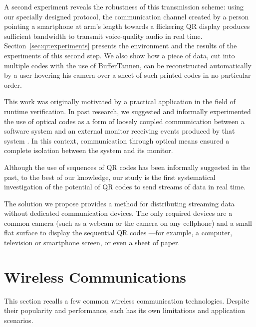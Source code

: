 A second experiment reveals the robustness of this transmission scheme: using our specially designed protocol, the communication channel created by a person pointing a smartphone at arm's length towards a flickering QR display produces sufficient bandwidth to transmit voice-quality audio in real time. Section~\ref{sec:qr:experiments} presents the environment and the results of the experiments of this second step. We also show how a piece of data, cut into multiple codes with the use of BufferTannen, can be reconstructed automatically by a user hovering his camera over a sheet of such printed codes in no particular order.

This work was originally motivated by a practical application in the field of runtime verification. In past research, we suggested and informally experimented the use of optical codes as a form of loosely coupled communication between a software system and an external monitor receiving events produced by that system \citep{DBLP_conf/rv/LavoieLVGH14}. In this context, communication through optical means ensured a complete isolation between the system and its monitor.

Although the use of sequences of QR codes has been informally suggested in the past, to the best of our knowledge, our study is the first systematical investigation of the potential of QR codes to send streams of data in real time. %

The solution we propose provides a method for distributing streaming data without dedicated communication devices. The only required devices are a common camera (such as a webcam or the camera on any cellphone) and a small flat surface to display the sequential QR codes ---for example, a computer, television or smartphone screen, or even a sheet of paper.


\section{Wireless Communications}\label{sec:qr:reading} %

This section recalls a few common wireless communication technologies. Despite their popularity and performance, each has its own limitations and application scenarios. %

